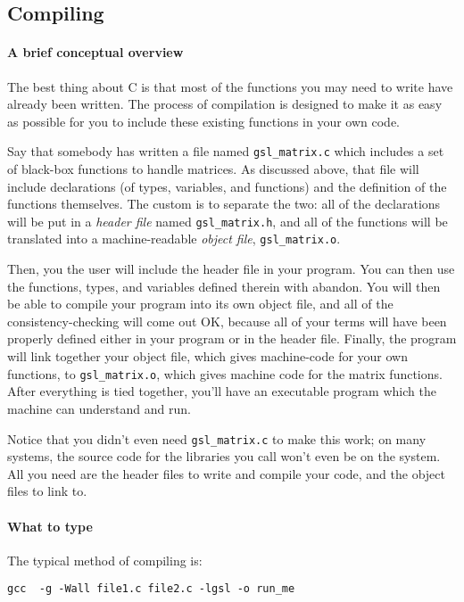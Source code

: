 \documentclass[12pt]{article}
\def\ind#1{\index{#1}#1}
\begin{document}
\subsection{Compiling}	 

\paragraph{A brief conceptual overview} The best thing about C is that most
of the functions you may need to write have already been written. The
process of compilation is designed to make it as easy as possible for
you to include these existing functions in your own code.

Say that somebody has written a file named {\tt gsl\_matrix.c} which
includes a set of black-box functions to handle matrices.
As discussed above,
that file will include declarations (of types, variables, and functions)
and the definition of the functions themselves. The custom is to separate
the two: all of the declarations will be put in a {\sl \ind{header file}}
named {\tt gsl\_matrix.h}, and all of the functions will be translated
into a machine-readable {\sl \ind{object file}}, {\tt gsl\_matrix.o}.

Then, you the user will include the header file in your program. You can then
use the functions, types, and variables defined therein with abandon.
You will then be able to compile your program into its own object file,
and all of the consistency-checking will come out OK, because all of your
terms will have been properly defined either in your program or in the
header file. Finally, the program will link together your object file,
which gives machine-code for your own functions, to {\tt gsl\_matrix.o},
which gives machine code for the matrix functions. After everything is
tied together, you'll have an executable program which the machine can
understand and run.

Notice that you didn't even need {\tt gsl\_matrix.c} to make this work;
on many systems, the source code for the libraries you call
won't even be on the system. All you need are the 
header files to write and compile your code, and the
object files to link to.



\paragraph{What to type}
The typical method of compiling is:

\begin{verbatim}
gcc  -g -Wall file1.c file2.c -lgsl -o run_me
\end{verbatim}
\end{document}
